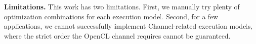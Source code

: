 \vspace{0.7em}
\noindent
{\bf Limitations. }This work has two limitations. First, we manually try plenty of optimization combinations for each execution model. Second, for a few applications, we cannot successfully implement Channel-related execution models, where the strict order the OpenCL channel requires cannot be guaranteed. %










